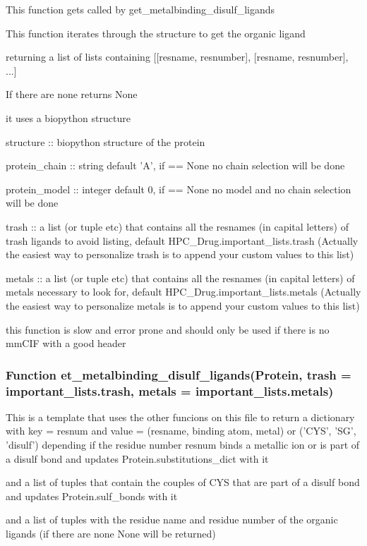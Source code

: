         This function gets called by get\_metalbinding\_disulf\_ligands

        This function iterates through the structure to get the organic ligand

        returning a list of lists containing [[resname, resnumber], [resname, resnumber], ...]

        If there are none returns None

        it uses a biopython structure

        structure :: biopython structure of the protein

        protein\_chain :: string default 'A', if == None no chain selection will be done

        protein\_model :: integer default 0, if == None no model and no chain selection will be done

        trash :: a list (or tuple etc) that contains all the resnames (in capital letters) of trash ligands to avoid listing, default HPC\_Drug.important\_lists.trash (Actually the easiest way to personalize trash is to append your custom values to this list)

        metals :: a list (or tuple etc) that contains all the resnames (in capital letters) of metals necessary to look for, default HPC\_Drug.important\_lists.metals (Actually the easiest way to personalize metals is to append your custom values to this list)

        this function is slow and error prone and should only be used if there is no mmCIF with a good header

    \subsubsection{Function et\_metalbinding\_disulf\_ligands(Protein, trash = important\_lists.trash, metals = important\_lists.metals)}
    
        This is a template that uses the other funcions on this file to return a dictionary with key = resnum and value = (resname, binding atom, metal) or ('CYS', 'SG', 'disulf') depending if the residue number {resnum} binds a metallic ion or is part of a disulf bond and updates Protein.substitutions\_dict with it

        and a list of tuples that contain the couples of CYS that are part of a disulf bond and updates Protein.sulf\_bonds with it

        and a list of tuples with the residue name and residue number of the organic ligands (if there are none None will be returned)


